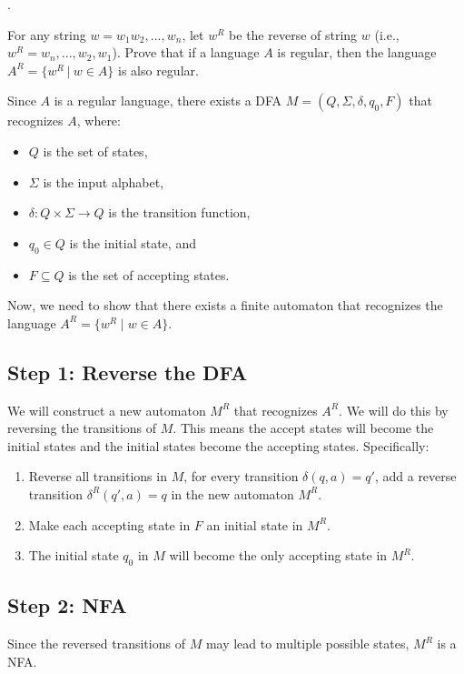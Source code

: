 \documentclass[12pt]{article}
\newcounter{quesnum}
\newcommand{\question}[2][??]{
\begin{list}{\labelitemi}{\leftmargin=2em}
\item [\arabic{quesnum}.] {} {#2}
\end{list}
\addtocounter{quesnum}{1}
}
\begin{document}
\vspace{12pt}

\question[3]{
For any string $w = w_1w_2,...,w_n$, let $w^R$ be the reverse of string $w$ (i.e., $w^R=w_n,...,w_2,w_1$). Prove that if a language $A$ is regular, then the language $A^R = \{w^R \ | \ w \in A\}$ is also regular.


}

Since \( A \) is a regular language, there exists a DFA \( M = (Q, \Sigma, \delta, q_0, F) \) that recognizes \( A \), where:

\begin{itemize}
    \item \( Q \) is the set of states,
    \item \( \Sigma \) is the input alphabet,
    \item \( \delta: Q \times \Sigma \to Q \) is the transition function,
    \item \( q_0 \in Q \) is the initial state, and
    \item \( F \subseteq Q \) is the set of accepting states.
\end{itemize}

Now, we need to show that there exists a finite automaton that recognizes the language \( A^R = \{ w^R \mid w \in A \} \).

\subsection*{Step 1: Reverse the DFA}
We will construct a new automaton \( M^R \) that recognizes \( A^R \). We will do this by reversing the transitions of \( M \). This means the accept states will become the initial states and the initial states become the accepting states. Specifically:

\begin{enumerate}
    \item Reverse all transitions in \( M \), for every transition \( \delta(q, a) = q' \), add a reverse transition \( \delta^R(q', a) = q \) in the new automaton \( M^R \).
    \item Make each accepting state in \( F \) an initial state in \( M^R \).
    \item The initial state \( q_0 \) in \( M \) will become the only accepting state in \( M^R \).
\end{enumerate}

\subsection*{Step 2: NFA}
Since the reversed transitions of \( M\) may lead to multiple possible states, \( M^R \) is a NFA.
\end{document}
